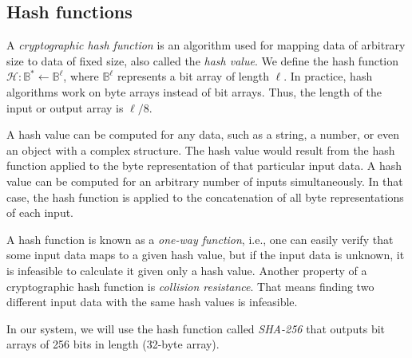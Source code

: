 \clearpage
\subsection{Hash functions} \label{app: hash functions}
A \textit{cryptographic hash function} is an algorithm used for mapping data of arbitrary size to data of fixed size, also called the \textit{hash value}. We define the hash function $\mathcal{H} : \mathbb{B}^* \gets \mathbb{B}^\ell$, where $\mathbb{B}^\ell$ represents a bit array of length $\ell$. In practice, hash algorithms work on byte arrays instead of bit arrays. Thus, the length of the input or output array is $\ell/8$.

A hash value can be computed for any data, such as a string, a number, or even an object with a complex structure. The hash value would result from the hash function applied to the byte representation of that particular input data. A hash value can be computed for an arbitrary number of inputs simultaneously. In that case, the hash function is applied to the concatenation of all byte representations of each input.

A hash function is known as a \textit{one-way function}, i.e., one can easily verify that some input data maps to a given hash value, but if the input data is unknown, it is infeasible to calculate it given only a hash value. Another property of a cryptographic hash function is \textit{collision resistance}. That means finding two different input data with the same hash values is infeasible.

In our system, we will use the hash function called \textit{SHA-256} that outputs bit arrays of 256 bits in length (32-byte array).
